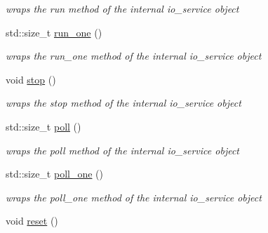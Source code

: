 \begin{DoxyCompactItemize}
\begin{DoxyCompactList}\small\item\em wraps the run method of the internal io\+\_\+service object \end{DoxyCompactList}\item 
std\+::size\+\_\+t \hyperlink{classwebsocketpp_1_1transport_1_1asio_1_1endpoint_a06b42e739e095b5ec489b59a655b2242}{run\+\_\+one} ()
\begin{DoxyCompactList}\small\item\em wraps the run\+\_\+one method of the internal io\+\_\+service object \end{DoxyCompactList}\item 
void \hyperlink{classwebsocketpp_1_1transport_1_1asio_1_1endpoint_a5aaf6de5a0a7f868c60f5d611a8e399c}{stop} ()\hypertarget{classwebsocketpp_1_1transport_1_1asio_1_1endpoint_a5aaf6de5a0a7f868c60f5d611a8e399c}{}\label{classwebsocketpp_1_1transport_1_1asio_1_1endpoint_a5aaf6de5a0a7f868c60f5d611a8e399c}

\begin{DoxyCompactList}\small\item\em wraps the stop method of the internal io\+\_\+service object \end{DoxyCompactList}\item 
std\+::size\+\_\+t \hyperlink{classwebsocketpp_1_1transport_1_1asio_1_1endpoint_aa73831b3e81e61cd95bfbfab799a41b7}{poll} ()\hypertarget{classwebsocketpp_1_1transport_1_1asio_1_1endpoint_aa73831b3e81e61cd95bfbfab799a41b7}{}\label{classwebsocketpp_1_1transport_1_1asio_1_1endpoint_aa73831b3e81e61cd95bfbfab799a41b7}

\begin{DoxyCompactList}\small\item\em wraps the poll method of the internal io\+\_\+service object \end{DoxyCompactList}\item 
std\+::size\+\_\+t \hyperlink{classwebsocketpp_1_1transport_1_1asio_1_1endpoint_ae413ac572300c418cfd822845960cc6c}{poll\+\_\+one} ()\hypertarget{classwebsocketpp_1_1transport_1_1asio_1_1endpoint_ae413ac572300c418cfd822845960cc6c}{}\label{classwebsocketpp_1_1transport_1_1asio_1_1endpoint_ae413ac572300c418cfd822845960cc6c}

\begin{DoxyCompactList}\small\item\em wraps the poll\+\_\+one method of the internal io\+\_\+service object \end{DoxyCompactList}\item 
void \hyperlink{classwebsocketpp_1_1transport_1_1asio_1_1endpoint_ac79a1a69f86df035471ccdc9f4aea351}{reset} ()\hypertarget{classwebsocketpp_1_1transport_1_1asio_1_1endpoint_ac79a1a69f86df035471ccdc9f4aea351}{}\label{classwebsocketpp_1_1transport_1_1asio_1_1endpoint_ac79a1a69f86df035471ccdc9f4aea351}


\end{DoxyCompactItemize}
